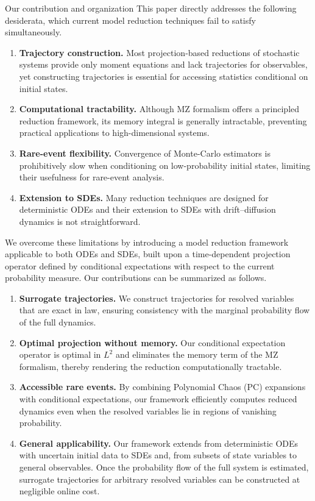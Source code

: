 \documentclass[11pt, a4paper, oneside, reqno]{amsart}
\makeatletter
\def\subsection{\@startsection{subsection}{2}%
	\z@{.5\linespacing\@plus.7\linespacing}{.5\linespacing}%
	{\normalfont\large\bfseries}}
\makeatother
\begin{document}
\subsection{Our contribution and organization}
\noindent This paper directly addresses the following desiderata, which current model reduction techniques fail to satisfy simultaneously.
\begin{enumerate}
\item {\bf Trajectory construction.} Most projection-based reductions of stochastic systems provide only moment equations and lack trajectories for observables, yet constructing trajectories is essential for accessing statistics conditional on initial states.
\item {\bf Computational tractability.} Although MZ formalism offers a principled reduction framework, its memory integral is generally intractable, preventing practical applications to high-dimensional systems.
\item {\bf Rare-event flexibility.} Convergence of Monte-Carlo estimators is prohibitively slow when conditioning on low-probability initial states, limiting their usefulness for rare-event analysis.
\item {\bf Extension to SDEs.}  Many reduction techniques are designed for deterministic ODEs and their extension to SDEs with drift–diffusion dynamics is not straightforward.
\end{enumerate}
We overcome these limitations by introducing a model reduction framework applicable to both ODEs and SDEs, built upon a time-dependent projection operator defined by conditional expectations with respect to the current probability measure. Our contributions can be summarized as follows.
\begin{enumerate}
\item {\bf Surrogate trajectories.} We construct trajectories for resolved variables that are exact in law, ensuring consistency with the marginal probability flow of the full dynamics. 
\item {\bf Optimal projection without memory.} Our conditional expectation operator is optimal in $L^2$ and eliminates the memory term of the MZ formalism, thereby rendering the reduction computationally tractable.
\item {\bf Accessible rare events.} By combining Polynomial Chaos (PC) expansions with conditional expectations, our framework efficiently computes reduced dynamics even when the resolved variables lie in regions of vanishing probability.
\item {\bf General applicability.} Our framework extends from deterministic ODEs with uncertain initial data to SDEs and, from subsets of state variables to general observables. Once the probability flow of the full system is estimated, surrogate trajectories for arbitrary resolved variables can be constructed at negligible online cost.
\end{enumerate}
\end{document}
